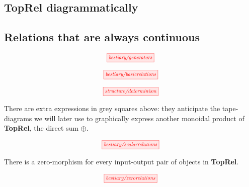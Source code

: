 \begin{fullwidth}

\section{\textbf{TopRel} diagrammatically}

\subsection{Relations that are always continuous}


\[\scalebox{0.75}{\tikzfig{bestiary/generators}}\]


\[\scalebox{0.75}{\tikzfig{bestiary/basicrelations}}\]


\[\scalebox{0.75}{\tikzfig{structure/determinism}}\]

 There are extra expressions in grey squares above: they anticipate the tape-diagrams we will later use to graphically express another monoidal product of \textbf{TopRel}, the direct sum $\oplus$.

\[\scalebox{0.75}{\tikzfig{bestiary/scalarrelations}}\]

 There is a zero-morphism for every input-output pair of objects in \textbf{TopRel}. 

\[\scalebox{0.75}{\tikzfig{bestiary/zerorelations}}\]

\end{fullwidth}
